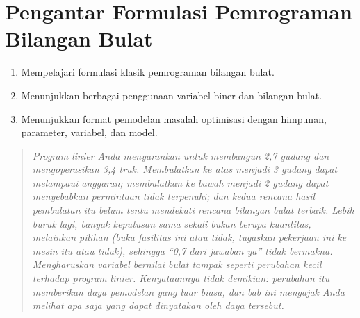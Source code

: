 


% 
%

\chapter{Pengantar Formulasi Pemrograman Bilangan Bulat}
\label{sec:IP-formulations} 
\begin{outcome}
\begin{enumerate}
\item[A.] Mempelajari formulasi klasik pemrograman bilangan bulat.
\item[B.] Menunjukkan berbagai penggunaan variabel biner dan bilangan bulat.
\item[C.] Menunjukkan format pemodelan masalah optimisasi dengan himpunan, parameter, variabel, dan model.
\end{enumerate}
\end{outcome}

\begin{quote}
\itshape Program linier Anda menyarankan untuk membangun 2,7 gudang dan mengoperasikan 3,4 truk. Membulatkan ke atas menjadi 3 gudang dapat melampaui anggaran; membulatkan ke bawah menjadi 2 gudang dapat menyebabkan permintaan tidak terpenuhi; dan kedua rencana hasil pembulatan itu belum tentu mendekati rencana bilangan bulat terbaik. Lebih buruk lagi, banyak keputusan sama sekali bukan berupa kuantitas, melainkan pilihan (buka fasilitas ini atau tidak, tugaskan pekerjaan ini ke mesin itu atau tidak), sehingga ``0,7 dari jawaban ya'' tidak bermakna. Mengharuskan variabel bernilai bulat tampak seperti perubahan kecil terhadap program linier. Kenyataannya tidak demikian: perubahan itu memberikan daya pemodelan yang luar biasa, dan bab ini mengajak Anda melihat apa saja yang dapat dinyatakan oleh daya tersebut.
\end{quote}





